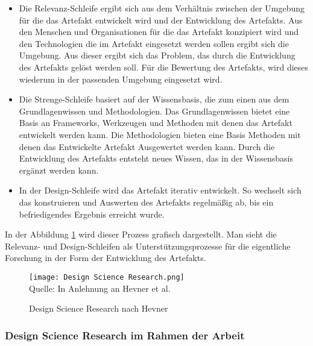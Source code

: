\begin{itemize}
    \item Die Relevanz-Schleife ergibt sich aus dem Verhältnis zwischen der Umgebung für die das Artefakt entwickelt wird und der Entwicklung des Artefakts. Aus den Menschen und Organisationen für die das Artefakt konzipiert wird und den Technologien die im Artefakt eingesetzt werden sollen ergibt sich die Umgebung. Aus dieser ergibt sich das Problem, das durch die Entwicklung des Artefakts gelöst werden soll. Für die Bewertung des Artefakts, wird dieses wiederum in der passenden Umgebung eingesetzt wird.
    \item Die Strenge-Schleife basiert auf der Wissensbasis, die zum einen aus dem Grundlagenwissen und Methodologien. Das Grundlagenwissen bietet eine Basis an Frameworks, Werkzeugen und Methoden mit denen das Artefakt entwickelt werden kann. Die Methodologien bieten eine Basis Methoden mit denen das Entwickelte Artefakt Ausgewertet werden kann. Durch die Entwicklung des Artefakts entsteht neues Wissen, das in der Wissensbasis ergänzt werden kann.
    \item In der Design-Schleife wird das Artefakt iterativ entwickelt. So wechselt sich das konstruieren und Auswerten des Artefakts regelmäßig ab, bis ein befriedigendes Ergebnis erreicht wurde.
\end{itemize}

In der Abbildung \ref{fig:DesignScienceResearch} wird dieser Prozess grafisch dargestellt. Man sieht die Relevanz- und Design-Schleifen als Unterstützungsprozesse für die eigentliche Forschung in der Form der Entwicklung des Artefakts.

\begin{figure}[H]
    \caption{Design Science Research nach Hevner}\label{fig:DesignScienceResearch}
    \texttt{[image: Design Science Research.png]}
    \\
    Quelle: In Anlehnung an Hevner et al. \cite[S.~80]{Hevner2004}
\end{figure}

\subsubsection{Design Science Research im Rahmen der Arbeit}

